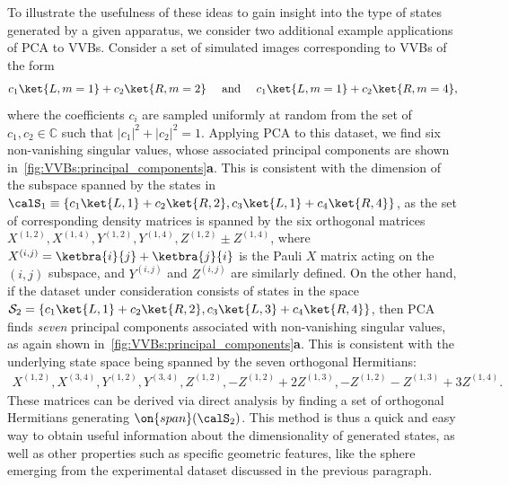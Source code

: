 To illustrate the usefulness of these ideas to gain insight into the type of states generated by a given apparatus, we consider two additional example applications of \ac{PCA} to VVBs.
Consider a set of simulated images corresponding to VVBs of the form
\begin{equation}
c_1\ket{L,m=1}+c_2\ket{R,m=2}
\quad\text{ and }\quad
c_1\ket{L,m=1}+c_2\ket{R,m=4},
\end{equation}
where the coefficients $c_i$ are sampled uniformly at random from the set of $c_{1},c_2\in\mathbb{C}$  such that $|c_1|^2+|c_2|^2=1$.
Applying PCA to this dataset, we find six non-vanishing singular values, whose associated principal components are shown in~\cref{fig:VVBs:principal_components}\textbf{a}.
This is consistent with the dimension of the subspace  spanned by the states in $\calS_1\equiv\{c_1\ket{L,1}+c_2\ket{R,2}, c_3\ket{L,1}+c_4\ket{R,4}\}$,  as the set of corresponding density matrices is spanned by the six orthogonal matrices
$X^{(1,2)}, X^{(1,4)}, Y^{(1,2)},Y^{(1,4)},Z^{(1,2)}\pm Z^{(1,4)}$, where $X^{(i,j)}=\ketbra{i}{j}+\ketbra{j}{i}$ is the Pauli $X$ matrix acting on the $(i,j)$ subspace, and $Y^{(i,j)}$ and $Z^{(i,j)}$ are similarly defined.
On the other hand, if the dataset under consideration consists of states in the space $\mathcal S_2=\{c_1\ket{L,1}+c_2\ket{R,2}, c_3\ket{L,3}+c_4\ket{R,4}\}$, then \ac{PCA} finds \emph{seven} principal components associated with non-vanishing singular values, as again shown in~\cref{fig:VVBs:principal_components}\textbf{a}.
This is consistent with the underlying state space being spanned by the seven orthogonal Hermitians:
\begin{equation}
\begin{gathered}
    X^{(1,2)}, X^{(3,4)},
    Y^{(1,2)}, Y^{(3,4)},
    Z^{(1,2)},
    -Z^{(1,2)} + 2 Z^{(1,3)},
    -Z^{(1,2)} - Z^{(1,3)} + 3 Z^{(1,4)}.
\end{gathered}
\end{equation}
These matrices can be derived via direct analysis by finding a set of orthogonal Hermitians generating $\on{span}(\calS_2)$.
This method is thus a quick and easy way to obtain useful information about the dimensionality of generated states, as well as other properties such as specific geometric features, like the sphere emerging from the experimental dataset discussed in the previous paragraph.



